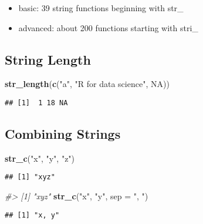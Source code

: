 \documentclass[
]{article}
\newenvironment{Shaded}{\begin{snugshade}}{\end{snugshade}}
\newcommand{\CommentTok}[1]{\textcolor[rgb]{0.56,0.35,0.01}{\textit{#1}}}
\newcommand{\DataTypeTok}[1]{\textcolor[rgb]{0.13,0.29,0.53}{#1}}
\newcommand{\KeywordTok}[1]{\textcolor[rgb]{0.13,0.29,0.53}{\textbf{#1}}}
\newcommand{\NormalTok}[1]{#1}
\newcommand{\OtherTok}[1]{\textcolor[rgb]{0.56,0.35,0.01}{#1}}
\newcommand{\StringTok}[1]{\textcolor[rgb]{0.31,0.60,0.02}{#1}}
\providecommand{\tightlist}{%
  \setlength{\itemsep}{0pt}\setlength{\parskip}{0pt}}
\begin{document}
\begin{itemize}
\tightlist
\item
  basic: 39 string functions beginning with str\_
\item
  advanced: about 200 functions starting with stri\_
\end{itemize}

\hypertarget{string-length}{%
\subsection{String Length}\label{string-length}}

\begin{Shaded}
\begin{Highlighting}[]
\KeywordTok{str\_length}\NormalTok{(}\KeywordTok{c}\NormalTok{(}\StringTok{"a"}\NormalTok{, }\StringTok{"R for data science"}\NormalTok{, }\OtherTok{NA}\NormalTok{))}
\end{Highlighting}
\end{Shaded}

\begin{verbatim}
## [1]  1 18 NA
\end{verbatim}

\hypertarget{combining-strings}{%
\subsection{Combining Strings}\label{combining-strings}}

\begin{Shaded}
\begin{Highlighting}[]
\KeywordTok{str\_c}\NormalTok{(}\StringTok{"x"}\NormalTok{, }\StringTok{"y"}\NormalTok{, }\StringTok{"z"}\NormalTok{)}
\end{Highlighting}
\end{Shaded}

\begin{verbatim}
## [1] "xyz"
\end{verbatim}

\begin{Shaded}
\begin{Highlighting}[]
\CommentTok{\#\textgreater{} [1] "xyz"}
\KeywordTok{str\_c}\NormalTok{(}\StringTok{"x"}\NormalTok{, }\StringTok{"y"}\NormalTok{, }\DataTypeTok{sep =} \StringTok{", "}\NormalTok{)}
\end{Highlighting}
\end{Shaded}

\begin{verbatim}
## [1] "x, y"
\end{verbatim}
\end{document}
